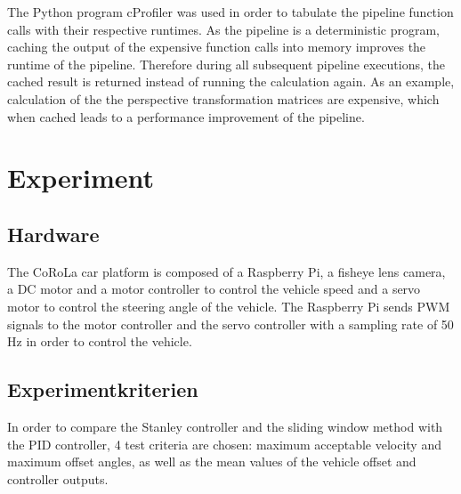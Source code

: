 \documentclass[arbeit=studie,oneside,BCOR=12mm]{ArbeitRST}
\begin{document}
The Python program cProfiler was used in order to tabulate the pipeline
function calls with their respective runtimes. As the pipeline is a
deterministic program, caching the output of the expensive function calls into
memory improves the runtime of the pipeline. Therefore during all subsequent
pipeline executions, the cached result is returned instead of running the
calculation again. As an example, calculation of the the perspective
transformation matrices are expensive, which when cached leads to a performance
improvement of the pipeline.

\iffalse

In order to prove the performance improvement of the pipeline, an experiment
was implemented. First, the pipeline is executed once and the runtime ignored
as the performance improvement is only relevant to subsequent executions of the
pipeline. Therefore, on the second execution of the pipeline, the runtime is
measured for both pipeline variants, with and without caching the expensive
function calls from the first execution. The experiment is then run 100 times
and the result tabulated. The arithmetic mean of the runtimes for both variants
are then compared to one another to measure the speed improvement. The values
are in TABLE, showing that by caching the expensive function calls, the
pipeline processing speed improved by VALUE%

\fi

\chapter{Experiment}
\section{Hardware}

The CoRoLa car platform is composed of a Raspberry Pi, a fisheye lens camera, a
DC motor and a motor controller to control the vehicle speed and a servo motor
to control the steering angle of the vehicle. The Raspberry Pi sends PWM
signals to the motor controller and the servo controller with a sampling rate
of 50 Hz in order to control the vehicle. 

\section{Experimentkriterien}

In order to compare the Stanley controller and the sliding window method with
the PID controller, 4 test criteria are chosen: maximum acceptable velocity and
maximum offset angles, as well as the mean values of the vehicle
offset and controller outputs.
\end{document}
